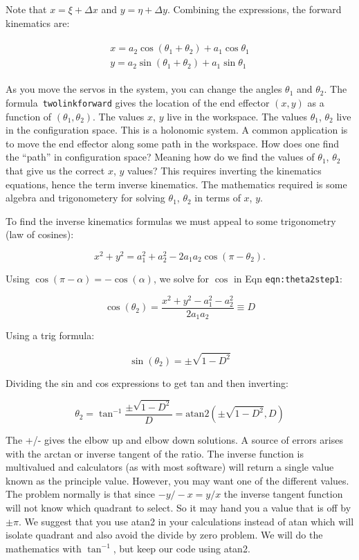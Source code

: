 Note that \(x = \xi + \Delta x\) and \(y = \eta + \Delta y\). Combining
the expressions, the forward kinematics are:

\[\begin{aligned}
\begin{matrix}
x = a_2\cos (\theta_1+\theta_2) + a_1 \cos \theta_1 \\
y = a_2 \sin (\theta_1 +\theta_2) + a_1\sin \theta_1
\end{matrix}
\end{aligned}\]

As you move the servos in the system, you can change the angles
\(\theta_1\) and \(\theta_2\). The formula~\texttt{twolinkforward} gives
the location of the end effector \((x,y)\) as a function of
\((\theta_1, \theta_2)\). The values \(x\), \(y\) live in the workspace.
The values \(\theta_1\), \(\theta_2\) live in the configuration space.
This is a holonomic system. A common application is to move the end
effector along some path in the workspace. How does one find the
``path'' in configuration space? Meaning how do we find the values of
\(\theta_1\), \(\theta_2\) that give us the correct \(x\), \(y\) values?
This requires inverting the kinematics equations, hence the term inverse
kinematics. The mathematics required is some algebra and trigonometery
for solving \(\theta_1\), \(\theta_2\) in terms of \(x\), \(y\).

To find the inverse kinematics formulas we must appeal to some
trigonometry (law of cosines):

\[x^2 + y^2 = a_1^2 + a_2^2 - 2a_1a_2 \cos (\pi - \theta_2).\]

Using \(\cos(\pi - \alpha) = -\cos(\alpha)\), we solve for \(\cos\) in
Eqn \texttt{eqn:theta2step1}:

\[\cos(\theta_2) = \frac{x^2 + y^2 - a_1^2 - a_2^2}{2a_1a_2 }\equiv D\]

Using a trig formula:

\[\sin(\theta_2) = \pm \sqrt{1-D^2}\]

Dividing the sin and cos expressions to get tan and then inverting:

\[\theta_2 = \tan^{-1}\frac{\pm\sqrt{1-D^2}}{D} = \mbox{atan2}(\pm\sqrt{1-D^2},D)\]

The +/- gives the elbow up and elbow down solutions. A source of errors
arises with the arctan or inverse tangent of the ratio. The inverse
function is multivalued and calculators (as with most software) will
return a single value known as the principle value. However, you may
want one of the different values. The problem normally is that since
\(-y/-x = y/x\) the inverse tangent function will not know which
quadrant to select. So it may hand you a value that is off by
\(\pm \pi\). We suggest that you use atan2 in your calculations instead
of atan which will isolate quadrant and also avoid the divide by zero
problem. We will do the mathematics with \(\tan^{-1}\), but keep our
code using atan2.

